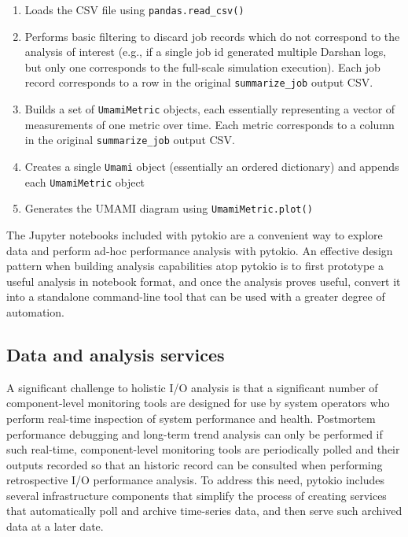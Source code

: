 \begin{enumerate}[leftmargin=*]
\item Loads the CSV file using \texttt{pandas.read\_csv()}
\item Performs basic filtering to discard job records which do not correspond to the analysis of interest (e.g., if a single job id generated multiple Darshan logs, but only one corresponds to the full-scale simulation execution).  Each job record corresponds to a row in the original \texttt{summarize\_job} output CSV.
\item Builds a set of \texttt{UmamiMetric} objects, each essentially representing a vector of measurements of one metric over time.  Each metric corresponds to a column in the original \texttt{summarize\_job} output CSV.
\item Creates a single \texttt{Umami} object (essentially an ordered dictionary) and appends each \texttt{UmamiMetric} object
\item Generates the UMAMI diagram using \texttt{UmamiMetric.plot()}
\end{enumerate}

The Jupyter notebooks included with pytokio are a convenient way to explore data and perform ad-hoc performance analysis with pytokio.
An effective design pattern when building analysis capabilities atop pytokio is to first prototype a useful analysis in notebook format, and once the analysis proves useful, convert it into a standalone command-line tool that can be used with a greater degree of automation.

\subsection{Data and analysis services} \label{sec:apps/services}

A significant challenge to holistic I/O analysis is that a significant number of component-level monitoring tools are designed for use by system operators who perform real-time inspection of system performance and health.
Postmortem performance debugging and long-term trend analysis can only be performed if such real-time, component-level monitoring tools are periodically polled and their outputs recorded so that an historic record can be consulted when performing retrospective I/O performance analysis.
To address this need, pytokio includes several infrastructure components that simplify the process of creating services that automatically poll and archive time-series data, and then serve such archived data at a later date.

